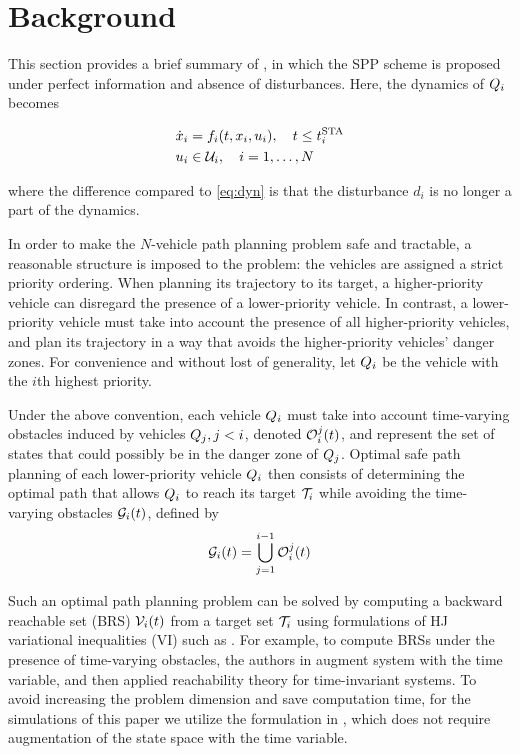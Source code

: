 \section{Background \label{sec:background}}
This section provides a brief summary of \cite{Chen15}, in which the SPP scheme is proposed under perfect information and absence of disturbances. Here, the dynamics of $Q_i$ becomes

\begin{equation}
\label{eq:dyn_no_dstb}
\begin{aligned}
\dot{x}_i &= f_i(t, x_i, u_i), \quad t \le t^\text{STA}_i \\
u_i &\in \mathcal{U}_i, \quad i = 1,\ldots, N
\end{aligned}
\end{equation}

\noindent where the difference compared to \eqref{eq:dyn} is that the disturbance $d_i$ is no longer a part of the dynamics.

In order to make the $N$-vehicle path planning problem safe and tractable, a reasonable structure is imposed to the problem: the vehicles are assigned a strict priority ordering. When planning its trajectory to its target, a higher-priority vehicle can disregard the presence of a lower-priority vehicle. In contrast, a lower-priority vehicle must take into account the presence of all higher-priority vehicles, and plan its trajectory in a way that avoids the higher-priority vehicles' danger zones. For convenience and without lost of generality, let $Q_i$ be the vehicle with the $i$th highest priority. 

Under the above convention, each vehicle $Q_i$ must take into account time-varying obstacles induced by vehicles $Q_j, j<i$, denoted $\mathcal{O}_i^j(t)$, and represent the set of states that could possibly be in the danger zone of $Q_j$. Optimal safe path planning of each lower-priority vehicle $Q_i$ then consists of determining the optimal path that allows $Q_i$ to reach its target $\mathcal{T}_i$ while avoiding the time-varying obstacles $\mathcal{G}_i(t)$, defined by
\vspace{-1em}
\begin{equation}
\label{eq:ioset}
\mathcal{G}_i(t) = \bigcup_{j=1}^{i-1}\mathcal{O}_i^j(t)
\end{equation}

Such an optimal path planning problem can be solved by computing a backward reachable set (BRS) $\mathcal{V}_i(t)$ from a target set $\mathcal{T}_i$ using formulations of HJ variational inequalities (VI) such as \cite{Barron90, Bokanowski10, Bokanowski11, Fisac15}. For example, to compute BRSs under the presence of time-varying obstacles, the authors in \cite{Bokanowski11} augment system with the time variable, and then applied reachability theory for time-invariant systems. To avoid increasing the problem dimension and save computation time, for the simulations of this paper we utilize the formulation in \cite{Fisac15}, which does not require augmentation of the state space with the time variable.

